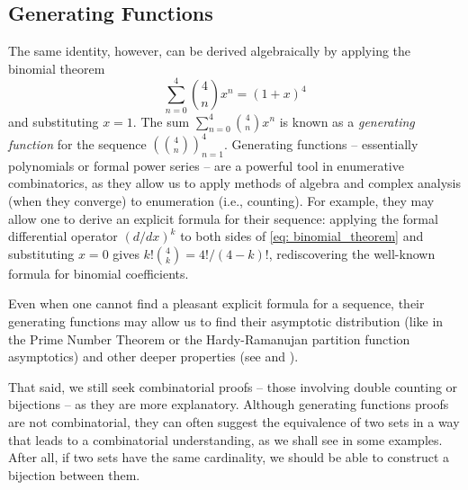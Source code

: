 \documentclass[a4paper,11pt]{article}
\numberwithin{equation}{section}
\begin{document}
   \subsection{Generating Functions} The same identity, however, can be derived algebraically by applying the binomial theorem
   \begin{equation}
        \label{eq: binomial_theorem}
        \sum\limits_{n=0}^{4} \binom{4}{n} x^{n} = (1+x)^{4} 
    \end{equation}
    and substituting \(x=1\). The sum \(\sum_{n=0}^{4} {4 \choose n} x^{n}\) is known as a \textit{generating function} for the sequence $\left({4 \choose n}\right)_{n=1}^{4}$. Generating functions -- essentially polynomials or formal power series -- are a powerful tool in enumerative combinatorics, as they allow us to apply methods of algebra and complex analysis (when they converge) to enumeration (i.e., counting). For example, they may allow one to derive an explicit formula for their sequence: applying the formal differential operator $(d/{dx})^k$ to both sides of \eqref{eq: binomial_theorem} and substituting $x=0$ gives $k! \binom{4}{k} = {4!}/{(4-k)!}$, rediscovering the well-known formula for binomial coefficients. \smallskip 
    
    Even when one cannot find a pleasant explicit formula for a sequence, their generating functions may allow us to find their asymptotic distribution (like in the Prime Number Theorem or the Hardy-Ramanujan partition function asymptotics) and other deeper properties (see \cite[p.~2]{wilf2006generatingfunctionology} and \cite[Section VIII.6.]{flajoletAnalyticCombinatorics2013}). \smallskip
    
    That said, we still seek combinatorial proofs -- those involving double counting or bijections -- as they are more explanatory.  Although generating functions proofs are not combinatorial, they can often suggest the equivalence of two sets in a way that leads to a combinatorial understanding, as we shall see in some examples. After all, if two sets have the same cardinality, we should be able to construct a bijection between them. 
    
\end{document}
